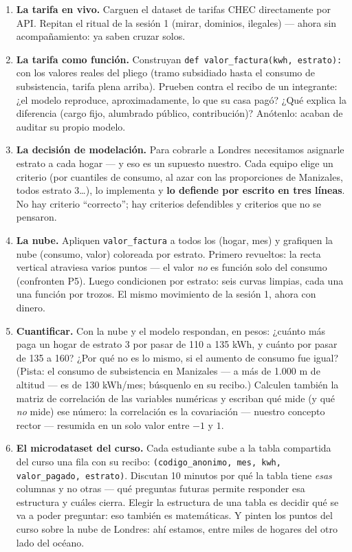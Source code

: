 \documentclass[12pt,letterpaper]{article}
\begin{document}
\begin{enumerate}[label=\arabic*.]
    \item \textbf{La tarifa en vivo.} Carguen el dataset de tarifas CHEC directamente por API. Repitan el ritual de la sesión 1 (mirar, dominios, ilegales) --- ahora sin acompañamiento: ya saben cruzar solos.
    \item \textbf{La tarifa como función.} Construyan \texttt{def valor\_factura(kwh, estrato):} con los valores reales del pliego (tramo subsidiado hasta el consumo de subsistencia, tarifa plena arriba). Prueben contra el recibo de un integrante: ¿el modelo reproduce, aproximadamente, lo que su casa pagó? ¿Qué explica la diferencia (cargo fijo, alumbrado público, contribución)? Anótenlo: acaban de auditar su propio modelo.
    \item \textbf{La decisión de modelación.} Para cobrarle a Londres necesitamos asignarle estrato a cada hogar --- y eso es un supuesto nuestro. Cada equipo elige un criterio (por cuantiles de consumo, al azar con las proporciones de Manizales, todos estrato 3\ldots), lo implementa y \textbf{lo defiende por escrito en tres líneas}. No hay criterio ``correcto''; hay criterios defendibles y criterios que no se pensaron.
    \item \textbf{La nube.} Apliquen \texttt{valor\_factura} a todos los (hogar, mes) y grafiquen la nube (consumo, valor) coloreada por estrato. Primero revueltos: la recta vertical atraviesa varios puntos --- el valor \emph{no} es función solo del consumo (confronten P5). Luego condicionen por estrato: seis curvas limpias, cada una una función por trozos. El mismo movimiento de la sesión 1, ahora con dinero.
    \item \textbf{Cuantificar.} Con la nube y el modelo respondan, en pesos: ¿cuánto más paga un hogar de estrato 3 por pasar de 110 a 135 kWh, y cuánto por pasar de 135 a 160? ¿Por qué no es lo mismo, si el aumento de consumo fue igual? (Pista: el consumo de subsistencia en Manizales --- a más de 1.000 m de altitud --- es de 130 kWh/mes; búsquenlo en su recibo.) Calculen también la matriz de correlación de las variables numéricas y escriban qué mide (y qué \emph{no} mide) ese número: la correlación es la covariación --- nuestro concepto rector --- resumida en un solo valor entre $-1$ y $1$.
    \item \textbf{El microdataset del curso.} Cada estudiante sube a la tabla compartida del curso una fila con su recibo: \texttt{(codigo\_anonimo, mes, kwh, valor\_pagado, estrato)}. Discutan 10 minutos por qué la tabla tiene \emph{esas} columnas y no otras --- qué preguntas futuras permite responder esa estructura y cuáles cierra. Elegir la estructura de una tabla es decidir qué se va a poder preguntar: eso también es matemáticas. Y pinten los puntos del curso sobre la nube de Londres: ahí estamos, entre miles de hogares del otro lado del océano.
\end{enumerate}
\end{document}
